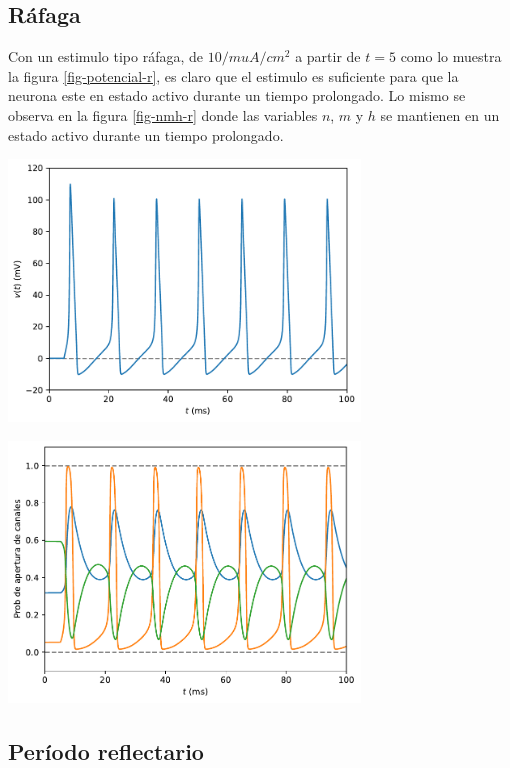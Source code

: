 \documentclass[aps,prl,reprint,groupedaddress]{revtex4-2}
\newenvironment{Figura}
  {\par\medskip\noindent\minipage{\linewidth}}
  {\endminipage\par\medskip}
\begin{document}
\subsection{Ráfaga}

Con un estimulo tipo ráfaga, de $10 /mu A/cm^{2}$ a partir de $t=5$ como lo muestra 
la figura \ref{fig-potencial-r}, es claro que el estimulo es suficiente para
que la neurona este en estado activo durante un tiempo prolongado. Lo mismo se 
observa en la figura \ref{fig-nmh-r} donde las variables $n$, $m$ y $h$ se
mantienen en un estado activo durante un tiempo prolongado.
\begin{Figura}
    \centering
    \includegraphics[width=0.7\textwidth]{figs/potencial_rafaga.pdf}
    \label{fig-potencial-r}
\end{Figura}

\begin{Figura}
    \centering
    \includegraphics[width=0.7\textwidth]{figs/nmh_rafaga.pdf}
    \label{fig-nmh-r}
\end{Figura}

\subsection{Período reflectario}
\end{document}
